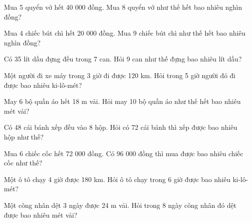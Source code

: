 \begin{ex}
Mua 5 quyển vở hết 40 000 đồng. Mua 8 quyển vở như thế hết bao nhiêu nghìn đồng?
\end{ex}

\begin{ex}
Mua 4 chiếc bút chì hết 20 000 đồng. Mua 9 chiếc bút chì như thế hết bao nhiêu nghìn đồng?
\end{ex}

\begin{ex}
Có 35 lít dầu đựng đều trong 7 can. Hỏi 9 can như thế đựng bao nhiêu lít dầu?
\end{ex}

\begin{ex}
Một người đi xe máy trong 3 giờ đi được 120 km. Hỏi trong 5 giờ người đó đi được bao nhiêu ki-lô-mét?
\end{ex}

\begin{ex}
May 6 bộ quần áo hết 18 m vải. Hỏi may 10 bộ quần áo như thế hết bao nhiêu mét vải?
\end{ex}

\begin{ex}
Có 48 cái bánh xếp đều vào 8 hộp. Hỏi có 72 cái bánh thì xếp được bao nhiêu hộp như thế?
\end{ex}

\begin{ex}
Mua 6 chiếc cốc hết 72 000 đồng. Có 96 000 đồng thì mua được bao nhiêu chiếc cốc như thế?
\end{ex}

\begin{ex}
Một ô tô chạy 4 giờ được 180 km. Hỏi ô tô chạy trong 6 giờ được bao nhiêu ki-lô-mét?
\end{ex}

\begin{ex}
Một công nhân dệt 3 ngày được 24 m vải. Hỏi trong 8 ngày công nhân đó dệt được bao nhiêu mét vải?
\end{ex}

